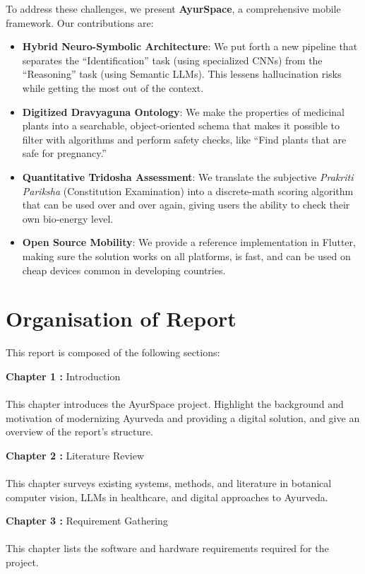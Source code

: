 To address these challenges, we present \textbf{AyurSpace}, a comprehensive mobile framework. Our contributions are:
\begin{itemize}
    \item \textbf{Hybrid Neuro-Symbolic Architecture}: We put forth a new pipeline that separates the ``Identification'' task (using specialized CNNs) from the ``Reasoning'' task (using Semantic LLMs). This lessens hallucination risks while getting the most out of the context.
    \item \textbf{Digitized Dravyaguna Ontology}: We make the properties of medicinal plants into a searchable, object-oriented schema that makes it possible to filter with algorithms and perform safety checks, like ``Find plants that are safe for pregnancy.''
    \item \textbf{Quantitative Tridosha Assessment}: We translate the subjective \textit{Prakriti Pariksha} (Constitution Examination) into a discrete-math scoring algorithm that can be used over and over again, giving users the ability to check their own bio-energy level.
    \item \textbf{Open Source Mobility}: We provide a reference implementation in Flutter, making sure the solution works on all platforms, is fast, and can be used on cheap devices common in developing countries.
\end{itemize}

\newpage
\section{Organisation of Report}
\justify
This report is composed of the following sections:

\item{\textbf{Chapter 1 :}} Introduction\\\\
This chapter introduces the AyurSpace project. Highlight the background and motivation of modernizing Ayurveda and providing a digital solution, and give an overview of the report's structure.

\item{\textbf{Chapter 2 : }} Literature Review\\\\
This chapter surveys existing systems, methods, and literature in botanical computer vision, LLMs in healthcare, and digital approaches to Ayurveda.

\item{\textbf{Chapter 3 : }} Requirement Gathering\\\\
This chapter lists the software and hardware requirements required for the project.

